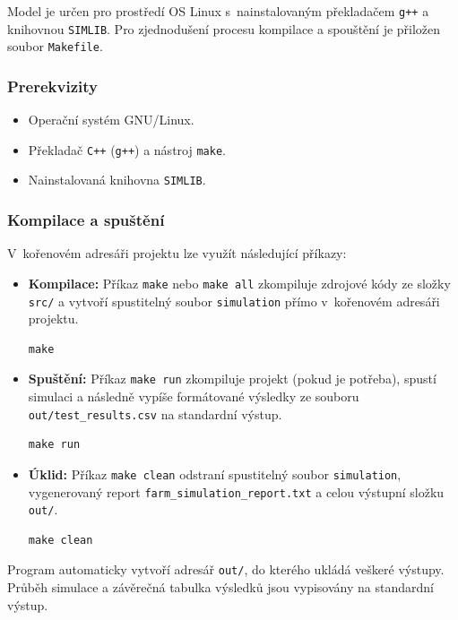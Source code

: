 \documentclass[11pt,a4paper]{article}
\begin{document}
Model je určen pro prostředí OS Linux s~nainstalovaným překladačem \texttt{g++} a knihovnou \texttt{SIMLIB}. Pro zjednodušení procesu kompilace a spouštění je přiložen soubor \texttt{Makefile}.

\subsubsection*{Prerekvizity}
\begin{itemize}
    \item Operační systém GNU/Linux.
    \item Překladač \texttt{C++} (\texttt{g++}) a nástroj \texttt{make}.
    \item Nainstalovaná knihovna \texttt{SIMLIB}.
\end{itemize}

\subsubsection*{Kompilace a spuštění}
V~kořenovém adresáři projektu lze využít následující příkazy:

\begin{itemize}
    \item \textbf{Kompilace:} Příkaz \texttt{make} nebo \texttt{make all} zkompiluje zdrojové kódy ze složky \texttt{src/} a vytvoří spustitelný soubor \texttt{simulation} přímo v~kořenovém adresáři projektu.
\begin{verbatim}
make
\end{verbatim}
    \item \textbf{Spuštění:} Příkaz \texttt{make run} zkompiluje projekt (pokud je potřeba), spustí simulaci a následně vypíše formátované výsledky ze souboru \texttt{out/test\_results.csv} na standardní výstup.
\begin{verbatim}
make run
\end{verbatim}
    \item \textbf{Úklid:} Příkaz \texttt{make clean} odstraní spustitelný soubor \texttt{simulation}, vygenerovaný report \texttt{farm\_simulation\_report.txt} a celou výstupní složku \texttt{out/}.
\begin{verbatim}
make clean
\end{verbatim}
\end{itemize}

Program automaticky vytvoří adresář \texttt{out/}, do kterého ukládá veškeré výstupy. Průběh simulace a závěrečná tabulka výsledků jsou vypisovány na standardní výstup.
\end{document}
